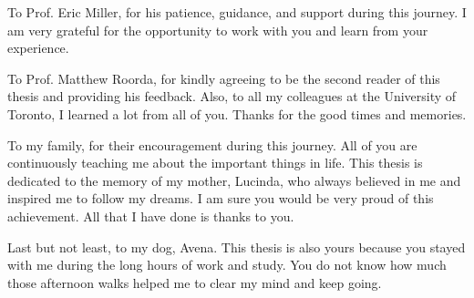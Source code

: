 \documentclass[twoside, 12pt]{report}
\begin{document}
\begin{sloppypar}
To Prof. Eric Miller, for his patience, guidance, and support during this journey. I am very grateful for the opportunity to work with you and learn from your experience.

To Prof. Matthew Roorda, for kindly agreeing to be the second reader of this thesis and providing his feedback. Also, to all my colleagues at the University of Toronto, I learned a lot from all of you. Thanks for the good times and memories.

To my family, for their encouragement during this journey. All of you are continuously teaching me about the important things in life. This thesis is dedicated to the memory of my mother, Lucinda, who always believed in me and inspired me to follow my dreams. I am sure you would be very proud of this achievement. All that I have done is thanks to you.

Last but not least, to my dog, Avena. This thesis is also yours because you stayed with me during the long hours of work and study. You do not know how much those afternoon walks helped me to clear my mind and keep going.


\tableofcontents
\listoffigures
\listoftables













\appendix




\end{sloppypar}
\end{document}
